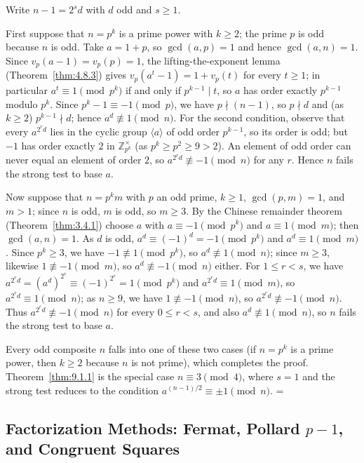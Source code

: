 \documentclass[11pt]{article}
\makeatletter
\theoremstyle{ntstyle}
\let\nt@closedisplay\]
\def\nt@guardedclose{\@ifnextchar\par{\nt@closeafterpar}{\@ifnextchar\end{\postdisplaypenalty\@M\nt@closedisplay}{\nt@closedisplay}}}
\def\nt@closeafterpar\par{\@ifnextchar\par{\nt@closeafterpar}{\@ifnextchar\end{\postdisplaypenalty\@M\nt@closedisplay\par}{\nt@closedisplay\par}}}
\renewenvironment{proof}[1][\proofname]{\par
  \pushQED{\qed}\normalfont\topsep\medskipamount\edef\nt@afterproof{\@endparpenalty=\the\@endparpenalty\relax}\@beginparpenalty\@M\@endparpenalty\@M\let\]\nt@guardedclose\trivlist\item[]\textit{#1\@addpunct{.}} \ignorespaces}{\ifvmode\addpenalty\@M\fi\popQED\nt@afterproof\endtrivlist\@endpefalse}
\newcommand{\ZmodUnits}[1]{\mathbb{Z}_{#1}^{\times}}
\makeatother
\begin{document}
\begin{proof} Write $n-1=2^{s}d$ with $d$ odd and $s\ge1$.

	First suppose that $n=p^{k}$ is a prime power with $k\ge2$; the prime
	$p$ is odd because $n$ is odd. Take $a=1+p$, so $\gcd(a, p)=1$ and
	hence $\gcd(a, n)=1$. Since
	$v_p(a-1)=v_p(p)=1$, the lifting-the-exponent lemma (Theorem~\ref{thm:4.8.3}) gives
	$v_p(a^{t}-1)=1+v_p(t)$ for every $t\ge1$; in particular
	$a^t\equiv1\pmod{p^k}$ if and only if $p^{k-1}\mid t$, so $a$ has order exactly
	$p^{k-1}$ modulo $p^k$. Since $p^k-1\equiv-1\pmod{p}$, we have $p\nmid(n-1)$,
	so $p\nmid d$ and (as $k\ge2$) $p^{k-1}\nmid d$; hence
	$a^{d}\not\equiv1\pmod{n}$. For the second condition, observe that every
	$a^{2^rd}$ lies in the cyclic group $\langle a\rangle$ of odd order
	$p^{k-1}$, so its order is odd; but $-1$ has order exactly $2$ in
	$\ZmodUnits{p^k}$ (as $p^k\ge p^2\ge9>2$). An
	element of odd order can never equal an element of order $2$, so
	$a^{2^{r}d}\not\equiv-1\pmod{n}$ for any $r$. Hence $n$ fails the
	strong test to base $a$.

	Now suppose that $n=p^{k}m$ with $p$ an odd prime, $k\ge1$,
	$\gcd(p, m)=1$, and $m>1$; since $n$ is odd, $m$ is odd, so $m\ge3$.
	By the
	Chinese remainder theorem (Theorem~\ref{thm:3.4.1}) choose $a$ with
	$a\equiv-1\pmod{p^k}$ and $a\equiv1\pmod{m}$; then $\gcd(a, n)=1$. As
	$d$ is odd, $a^{d}\equiv(-1)^d=-1\pmod{p^{k}}$ and $a^{d}\equiv1\pmod{m}$. Since $p^{k}\ge3$, we
	have $-1\not\equiv1\pmod{p^k}$, so
	$a^{d}\not\equiv1\pmod{n}$; since $m\ge3$, likewise $1\not\equiv-1\pmod{m}$, so
	$a^{d}\not\equiv-1\pmod{n}$ either. For $1\le r<s$, we have
	$a^{2^{r}d}=(a^{d})^{2^{r}}\equiv(-1)^{2^r}=1\pmod{p^{k}}$ and
	$a^{2^{r}d}\equiv1\pmod{m}$, so $a^{2^{r}d}\equiv1\pmod{n}$; as $n\ge9$,
	we have $1\not\equiv-1\pmod{n}$, so $a^{2^{r}d}\not\equiv-1\pmod{n}$. Thus
	$a^{2^{r}d}\not\equiv-1\pmod{n}$ for every $0\le r<s$, and also
	$a^{d}\not\equiv1\pmod{n}$, so $n$ fails the strong test to base $a$.

	Every odd composite $n$ falls into one of these two cases (if $n=p^{k}$ is a prime power, then
	$k\ge2$ because $n$ is not prime), which completes the
	proof. Theorem~\ref{thm:9.1.1} is the special case $n\equiv3\pmod{4}$, where
	$s=1$ and the strong test reduces to the condition
	$a^{(n-1)/2}\equiv\pm1\pmod{n}$.
\end{proof}
\subsection{Factorization Methods: Fermat, Pollard \texorpdfstring{$p-1$}{p-1}, and Congruent Squares}
\end{document}
